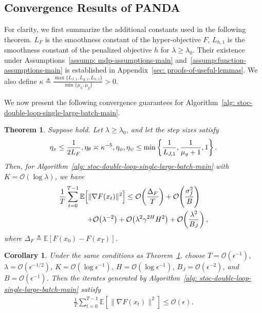 \documentclass{article}
\theoremstyle{plain}
\newtheorem{theorem}{Theorem}
\newtheorem{corollary}{Corollary}
\theoremstyle{definition}
\theoremstyle{remark}
\def\E{\mathbb E}
\def\cO{\mathcal O}
\def\bydef{\triangleq}
\begin{document}
\vspace{-3mm}
\subsection{Convergence Results of PANDA}
\vspace{-1mm}
For clarity, we first summarize the additional constants used in the following theorem. 
$L_F$ is the smoothness constant of the hyper-objective $F$, $L_{h,1}$ is the smoothness constant of the penalized objective $h$ for $\lambda\ge\lambda_0$. Their existence under Assumptions~\ref{assump: mdp-assumptions-main}
and~\ref{assump:function-assumptions-main} is established in Appendix~\ref{sec: proofs-of-useful-lemmas}. We also define $\kappa \bydef \frac{\max\{ L_{J,1}, L_{g,1}, L_{h,1}\}}{\min \{ \mu_h, \mu_g\}} >0$.

We now present the following convergence guarantees for Algorithm~\ref{alg: stoc-double-loop-single-large-batch-main}.
\begin{theorem}
\label{theorem: convergence-of-stoc-alg-3-large-batch-main}
Suppose  hold. Let $\lambda \ge \lambda_0$, and let the step sizes satisfy
\vspace{-2mm}
\begin{equation}\notag
    \eta_x \leq \frac{1}{2L_F},   \eta_\theta \asymp \kappa^{-5},  
      \eta_\phi,\eta_\psi \leq \min \left\{\frac{1}{L_{J,1}}, \frac{1}{\mu_g + 1}, 1 \right\}. 
\end{equation}
Then, for Algorithm~\ref{alg: stoc-double-loop-single-large-batch-main} with $K = \cO(\log \lambda)$, we have
\begin{align}\notag
\frac{1}{T}\sum_{t=0}^{T-1} \E  \Big[ \|\nabla & F(x_t)  \|^2\Big]
 \leq \cO\!\left(\frac{\Delta_F}{T}\right)  + \cO\!\left(\frac{\sigma_f^2}{B}\right) 
 \notag\\ 
 +  \cO\!&\left(\lambda^{-2}\right)  + \cO\!\left(\lambda^2\gamma^{2H}H^2\right) + \cO\!\left(\frac{\lambda^2}{B_J}\right),
\end{align}
where $\Delta_F \bydef \E \left[ F(x_0) - F(x_T) \right]$.
\end{theorem}

\begin{corollary}
\label{cor: complexity-of-stoc-alg-3-large-batch-main}
Under the same conditions as Theorem~\ref{theorem: convergence-of-stoc-alg-3-large-batch-main}, choose
$T = \cO(\epsilon^{-1})$, $\lambda = \cO(\epsilon^{-1/2})$, $K = \cO(\log \epsilon^{-1})$, $H = \cO(\log \epsilon^{-1})$, $B_{J} = \cO(\epsilon^{-2})$, and $B = \cO(\epsilon^{-1})$.
Then the iterates generated by Algorithm~\ref{alg: stoc-double-loop-single-large-batch-main} satisfy
\vspace{-2mm}
\begin{align}
\frac{1}{T}\sum_{t=0}^{T-1} \E \left[ \|\nabla F(x_t)  \|^2 \right] \leq \cO(\epsilon).
\end{align}
\vspace{-2mm}
\end{corollary}
\end{document}
